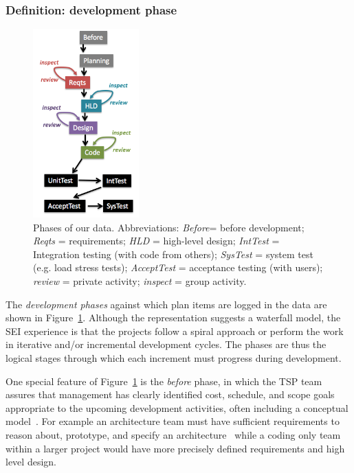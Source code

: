 \documentclass[smallcondensed]{svjour3}
\newcommand{\fig}[1]{Figure~\ref{fig:#1}}
\begin{document}
\subsubsection{Definition: development phase} \label{development_phase}
\begin{figure}[!b]  
\begin{center}
\includegraphics[width=1.6in]{wfall.png}  
\end{center}
\caption{Phases of our data.
Abbreviations: 
{\em Before}= before development; 
{\em Reqts}	  = requirements; 
{\em HLD}	  = high-level design; 
{\em IntTest} = Integration testing (with code from others); 
{\em SysTest} = system test (e.g. load stress tests); 
{\em AcceptTest}  = acceptance testing (with users); 
{\em review}        = private activity; 
{\em inspect}        = group activity.}
\label{fig:waterfall}
\end{figure}

The \textit{development phases} against which plan items are logged in the data are shown in \fig{waterfall}.
Although the representation suggests a waterfall model, the SEI experience is that the projects follow a spiral approach or perform the work in iterative and/or incremental development cycles. The phases are thus the logical stages through which each increment must progress during development.

One special feature of  \fig{waterfall} is the {\em before} phase, in which the TSP team assures that management has clearly identified cost, schedule, and scope goals appropriate to the upcoming development activities, often including a conceptual model~\cite{Humphrey:2005}. For example an architecture team must have sufficient requirements to reason about, prototype, and specify an architecture~\cite{Bachmann13} while a coding only team within a larger project would have more precisely defined requirements and high level design.
 
\end{document}

